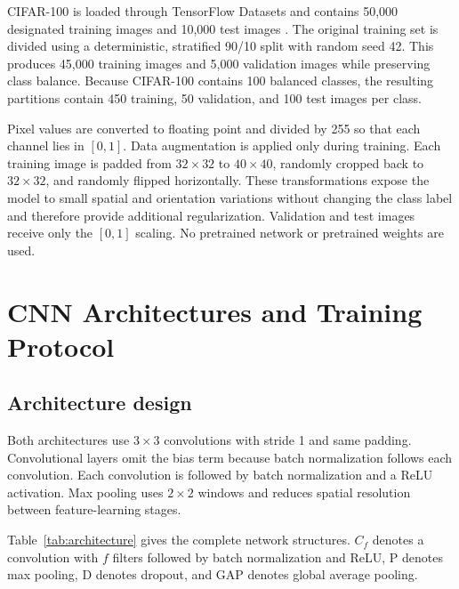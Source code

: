 \documentclass[conference]{IEEEtran}
\begin{document}
CIFAR-100 is loaded through TensorFlow Datasets and contains 50,000 designated training images and 10,000 test images \cite{cifar}. The original training set is divided using a deterministic, stratified 90/10 split with random seed 42. This produces 45,000 training images and 5,000 validation images while preserving class balance. Because CIFAR-100 contains 100 balanced classes, the resulting partitions contain 450 training, 50 validation, and 100 test images per class.

Pixel values are converted to floating point and divided by 255 so that each channel lies in $[0,1]$. Data augmentation is applied only during training. Each training image is padded from $32\times32$ to $40\times40$, randomly cropped back to $32\times32$, and randomly flipped horizontally. These transformations expose the model to small spatial and orientation variations without changing the class label and therefore provide additional regularization. Validation and test images receive only the $[0,1]$ scaling. No pretrained network or pretrained weights are used.


\section{CNN Architectures and Training Protocol}

\subsection{Architecture design}

Both architectures use $3\times3$ convolutions with stride 1 and same padding. Convolutional layers omit the bias term because batch normalization follows each convolution. Each convolution is followed by batch normalization and a ReLU activation. Max pooling uses $2\times2$ windows and reduces spatial resolution between feature-learning stages.

Table~\ref{tab:architecture} gives the complete network structures. $C_f$ denotes a convolution with $f$ filters followed by batch normalization and ReLU, P denotes max pooling, D denotes dropout, and GAP denotes global average pooling.
\end{document}
